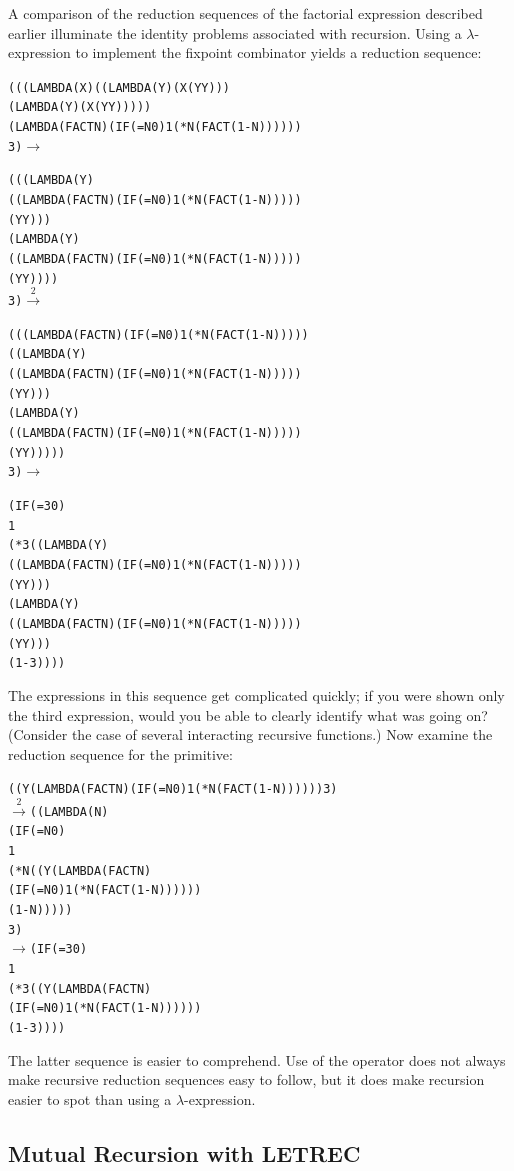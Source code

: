 A comparison of the reduction sequences of the factorial expression described
earlier illuminate the identity problems associated with recursion. Using a
\(\lambda\)-expression to implement the fixpoint combinator yields a reduction
sequence:
\begin{alltt}
(((LAMBDA (X) ((LAMBDA (Y) (X (Y Y)))
              (LAMBDA (Y) (X (Y Y)))))
  (LAMBDA (FACT N) (IF (= N 0) 1 (* N (FACT (1- N))))))
 3) \(\longrightarrow\)

(((LAMBDA (Y)
    ((LAMBDA (FACT N) (IF (= N 0) 1 (* N (FACT (1- N)))))
     (Y Y)))
  (LAMBDA (Y)
    ((LAMBDA (FACT N) (IF (= N 0) 1 (* N (FACT (1- N)))))
     (Y Y))))
 3) \(\xrightarrow{2}\)

(((LAMBDA (FACT N) (IF (= N 0) 1 (* N (FACT (1- N)))))
  ((LAMBDA (Y)
     ((LAMBDA (FACT N) (IF (= N 0) 1 (* N (FACT (1- N)))))
      (Y Y)))
   (LAMBDA (Y)
     ((LAMBDA (FACT N) (IF (= N 0) 1 (* N (FACT (1- N)))))
      (Y Y)))))
 3) \(\longrightarrow\)

(IF (= 3 0)
    1
    (* 3 ((LAMBDA (Y)
            ((LAMBDA (FACT N) (IF (= N 0) 1 (* N (FACT (1- N)))))
             (Y Y)))
          (LAMBDA (Y)
            ((LAMBDA (FACT N) (IF (= N 0) 1 (* N (FACT (1- N)))))
             (Y Y)))
          (1- 3))))
\end{alltt}
The expressions in this sequence get complicated quickly; if you were shown only
the third expression, would you be able to clearly identify what was going on?
(Consider the case of several interacting recursive functions.) Now examine the
reduction sequence for the  primitive:
\begin{alltt}
((Y (LAMBDA (FACT N) (IF (= N 0) 1 (* N (FACT (1- N)))))) 3)
  \(\xrightarrow{2}\) ((LAMBDA (N)
        (IF (= N 0)
            1
            (* N ((Y (LAMBDA (FACT N)
                       (IF (= N 0) 1 (* N (FACT (1- N))))))
                  (1- N)))))
      3)
  \(\longrightarrow\) (IF (= 3 0)
         1
         (* 3 ((Y (LAMBDA (FACT N)
                    (IF (= N 0) 1 (* N (FACT (1- N))))))
               (1- 3))))
\end{alltt}
The latter sequence is easier to comprehend. Use of the  operator does
not always make recursive reduction sequences easy to follow, but it does make
recursion easier to spot than using a \(\lambda\)-expression.

\subsection{Mutual Recursion with LETREC}

